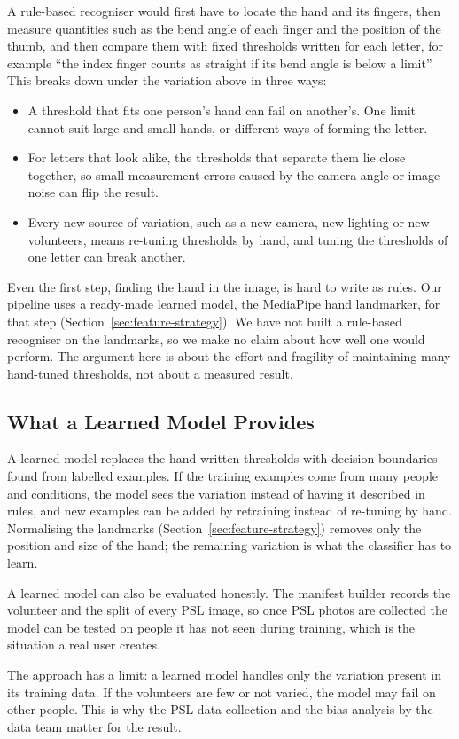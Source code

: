A rule-based recogniser would first have to locate the hand and its fingers, then measure quantities such as the bend angle of each finger and the position of the thumb, and then compare them with fixed thresholds written for each letter, for example ``the index finger counts as straight if its bend angle is below a limit''. This breaks down under the variation above in three ways:
\begin{itemize}[leftmargin=1.5em, topsep=2pt]
  \item A threshold that fits one person's hand can fail on another's. One limit cannot suit large and small hands, or different ways of forming the letter.
  \item For letters that look alike, the thresholds that separate them lie close together, so small measurement errors caused by the camera angle or image noise can flip the result.
  \item Every new source of variation, such as a new camera, new lighting or new volunteers, means re-tuning thresholds by hand, and tuning the thresholds of one letter can break another.
\end{itemize}
Even the first step, finding the hand in the image, is hard to write as rules. Our pipeline uses a ready-made learned model, the MediaPipe hand landmarker, for that step (Section~\ref{sec:feature-strategy}). We have not built a rule-based recogniser on the landmarks, so we make no claim about how well one would perform. The argument here is about the effort and fragility of maintaining many hand-tuned thresholds, not about a measured result.

\subsection{What a Learned Model Provides}

A learned model replaces the hand-written thresholds with decision boundaries found from labelled examples. If the training examples come from many people and conditions, the model sees the variation instead of having it described in rules, and new examples can be added by retraining instead of re-tuning by hand. Normalising the landmarks (Section~\ref{sec:feature-strategy}) removes only the position and size of the hand; the remaining variation is what the classifier has to learn.

A learned model can also be evaluated honestly. The manifest builder records the volunteer and the split of every PSL image, so once PSL photos are collected the model can be tested on people it has not seen during training, which is the situation a real user creates.

The approach has a limit: a learned model handles only the variation present in its training data. If the volunteers are few or not varied, the model may fail on other people. This is why the PSL data collection and the bias analysis by the data team matter for the result.